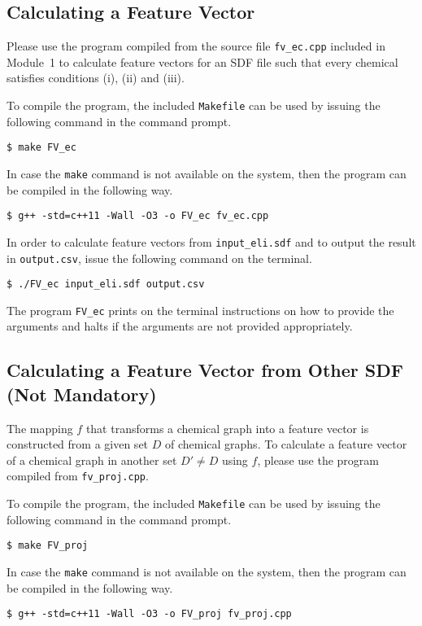 \documentclass[11pt, titlepage, dvipdfmx, twoside]{article}
\begin{document}
\subsection{Calculating a Feature Vector}
Please use the program compiled from the source file
{\tt fv\_ec.cpp} included in Module~1
to calculate feature vectors for an SDF file
such that every chemical 
satisfies conditions (i), (ii) and (iii).

To compile the program, the included {\tt Makefile}
can be used by issuing the following command in the
command prompt. 
\begin{oframed}
{\small
\verb|$ make FV_ec|
}
\end{oframed}
%
In case the {\tt make} command is not
available on the system,
then the program can be compiled in the following way. 
\begin{oframed}
{\small
\verb|$ g++ -std=c++11 -Wall -O3 -o FV_ec fv_ec.cpp|
}
\end{oframed}


In order to calculate feature vectors from {\tt input\_eli.sdf} and to output the result in {\tt output.csv},
issue the following command on the terminal. 
\begin{oframed}
{\small
\verb|$ ./FV_ec input_eli.sdf output.csv|
}
\end{oframed}
The program {\tt FV\_ec} prints on the terminal instructions on how to provide the arguments
and halts if the arguments are not provided appropriately.

\subsection{Calculating a Feature Vector from Other SDF (Not Mandatory)}

The mapping $f$ that transforms a chemical graph
into a feature vector is constructed from a given
set $D$ of chemical graphs.
To calculate a feature vector
of a chemical graph in another set $D'\ne D$
using $f$, please use the program compiled from 
{\tt fv\_proj.cpp}. 

To compile the program, the included {\tt Makefile}
can be used by issuing the following command in the command prompt.
\begin{oframed}
{\small
\verb|$ make FV_proj|
}
\end{oframed}
In case the {\tt make} command is not available on the system,
then the program can be compiled in the following way.
\begin{oframed}
{\small
\verb|$ g++ -std=c++11 -Wall -O3 -o FV_proj fv_proj.cpp|
}
\end{oframed}
\end{document}
